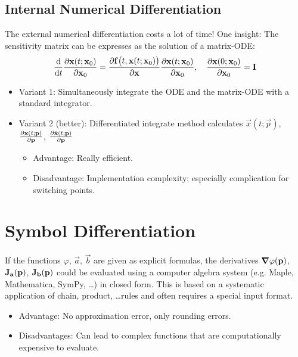 		\subsection{Internal Numerical Differentiation}
			The external numerical differentiation costs a lot of time! One insight: The sensitivity matrix can be expresses as the solution of a matrix-ODE:
			\begin{align*}
				\dv{t} \pdv{\boldsymbol{\mathrm{x}}(t; \boldsymbol{\mathrm{x}}_0)}{\boldsymbol{\mathrm{x}}_0} = \pdv{\boldsymbol{\mathrm{f}}\big(t, \boldsymbol{\mathrm{x}}(t; \boldsymbol{\mathrm{x}}_0)\big)}{\boldsymbol{\mathrm{x}}} \pdv{\boldsymbol{\mathrm{x}}(t; \boldsymbol{\mathrm{x}}_0)}{\boldsymbol{\mathrm{x}}_0},\quad \pdv{\boldsymbol{\mathrm{x}}(0; \boldsymbol{\mathrm{x}}_0)}{\boldsymbol{\mathrm{x}}_0} = \boldsymbol{\mathrm{I}}
			\end{align*}
			
			\begin{itemize}
				\item Variant 1: Simultaneously integrate the ODE and the matrix-ODE with a standard integrator.
				\item Variant 2 (better): Differentiated integrate method calculates \( \vec{x}(t; \vec{p}) \), \( \pdv{\boldsymbol{\mathrm{x}}(t; \boldsymbol{\mathrm{p}})}{\boldsymbol{\mathrm{p}}} \), \( \pdv{\dot{\boldsymbol{\mathrm{x}}}(t; \boldsymbol{\mathrm{p}})}{\boldsymbol{\mathrm{p}}} \)
					\begin{itemize}
						\item Advantage: Really efficient.
						\item Disadvantage: Implementation complexity; especially complication for switching points.
					\end{itemize}
			\end{itemize}

	\section{Symbol Differentiation}
		If the functions \( \varphi \), \( \vec{a} \), \( \vec{b} \) are given as explicit formulas, the derivatives \( \grad{\varphi}(\boldsymbol{\mathrm{p}}) \), \( \boldsymbol{\mathrm{J}}_{\boldsymbol{\mathrm{a}}}(\boldsymbol{\mathrm{p}}) \), \( \boldsymbol{\mathrm{J}}_{\boldsymbol{\mathrm{b}}}(\boldsymbol{\mathrm{p}}) \) could be evaluated using a computer algebra system (e.g. Maple, Mathematica, SymPy, \dots) in closed form. This is based on a systematic application of chain, product, \dots rules and often requires a special input format.
		\begin{itemize}
			\item Advantage: No approximation error, only rounding errors.
			\item Disadvantages: Can lead to complex functions that are computationally expensive to evaluate.
		\end{itemize}

